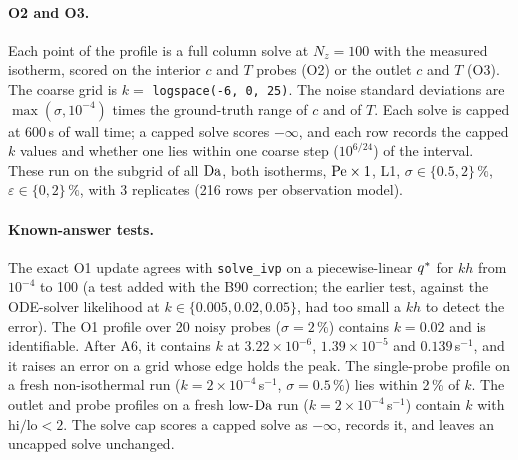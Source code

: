 \paragraph{O2 and O3.} Each point of the profile is a full column solve at $N_z = 100$ with
the measured isotherm, scored on the interior $c$ and $T$ probes (O2) or the outlet $c$ and
$T$ (O3). The coarse grid is $k = $ \texttt{logspace(-6, 0, 25)}. The noise standard deviations
are $\max(\sigma, 10^{-4})$ times the ground-truth range of $c$ and of $T$. Each solve is capped
at 600\,s of wall time; a capped solve scores $-\infty$, and each row records the capped $k$
values and whether one lies within one coarse step ($10^{6/24}$) of the interval. These run on
the subgrid of all $\mathrm{Da}$, both isotherms, $\mathrm{Pe} \times 1$, L1, $\sigma \in \{0.5, 2\}\,\%$,
$\varepsilon \in \{0, 2\}\,\%$, with 3 replicates (216 rows per observation model).

\paragraph{Known-answer tests.} The exact O1 update agrees with \texttt{solve\_ivp} on a
piecewise-linear $q^{*}$ for $kh$ from $10^{-4}$ to 100 (a test added with the B90 correction;
the earlier test, against the ODE-solver likelihood at $k \in \{0.005, 0.02, 0.05\}$, had too
small a $kh$ to detect the error). The O1 profile over 20
noisy probes ($\sigma = 2\,\%$) contains $k = 0.02$ and is identifiable. After A6, it contains $k$
at $3.22\times10^{-6}$, $1.39\times10^{-5}$ and $0.139$\,s$^{-1}$, and it raises an error on a
grid whose edge holds the peak. The single-probe profile on a fresh non-isothermal run
($k = 2\times10^{-4}$\,s$^{-1}$, $\sigma = 0.5\,\%$) lies within 2\,\% of $k$. The outlet and probe
profiles on a fresh low-$\mathrm{Da}$ run ($k = 2\times10^{-4}$\,s$^{-1}$) contain $k$ with
$\mathrm{hi}/\mathrm{lo} < 2$. The solve cap scores a capped solve as $-\infty$, records it, and
leaves an uncapped solve unchanged.

